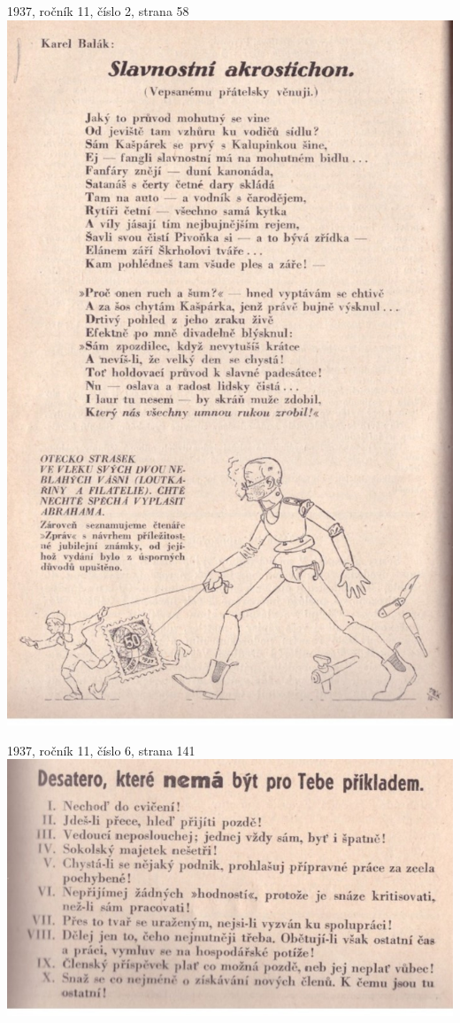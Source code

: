 \documentclass[11pt]{article}
\begin{document}
1937, ročník 11, číslo 2, strana 58 \\
\includegraphics[width=\imagewidth]{original/1937/Skener_20250325 (2).jpg}

1937, ročník 11, číslo 6, strana 141 \\
\includegraphics[width=\imagewidth]{original/1937/Skener_20250325 (3).jpg}
\end{document}
